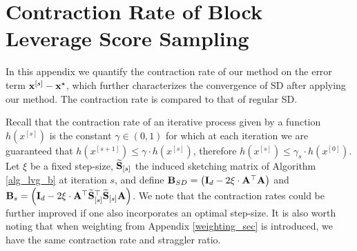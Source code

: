 \documentclass[journal,letterpaper,onecolumn,twoside,nofonttune]{IEEEtran}
\newcommand{\xb}{\bold{x}}
\newcommand{\Ab}{\bold{A}}
\newcommand{\Bb}{\bold{B}}
\newcommand{\Ib}{\bold{I}}
\newcommand{\Sb}{\bold{S}}
\newcommand{\Sbwt}{\widetilde{\Sb}}
\newtheorem{Prop}{Proposition}
\begin{document}

\section{Contraction Rate of Block Leverage Score Sampling}
\label{cont_rate_app}

In this appendix we quantify the contraction rate of our method on the error term $\xb^{[s]}-\xb^\star$, which further characterizes the convergence of SD after applying our method. The contraction rate is compared to that of regular SD.

Recall that the contraction rate of an iterative process given by a function $h(x^{[s]})$ is the constant $\gamma\in(0,1)$ for which at each iteration we are guaranteed that $h(x^{[s+1]})\leqslant \gamma\cdot h(x^{[s]})$, therefore $h(x^{[s]})\leqslant \gamma_s\cdot h(x^{[0]})$. Let $\xi$ be a fixed step-size, $\Sbwt_{[s]}$ the induced sketching matrix of Algorithm \ref{alg_lvg_b} at iteration $s$, and define $\Bb_{SD}=\left(\Ib_d-2\xi\cdot\Ab^\top\Ab\right)$ and $\Bb_s=\left(\Ib_d-2\xi\cdot\Ab^\top\Sbwt_{[s]}^\top\Sbwt_{[s]}\Ab\right)$. We note that the contraction rates could be further improved if one also incorporates an optimal step-size. It is also worth noting that when weighting from Appendix \ref{weighting_sec} is introduced, we have the same contraction rate and straggler ratio.
\end{document}
